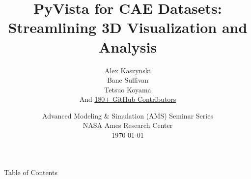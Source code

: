 \documentclass[t]{beamer}
\begin{document}
\title{
    PyVista for CAE Datasets: \\
    Streamlining 3D Visualization and Analysis
}

\author{
{\large Alex Kaszynski} \\[4pt]
{\large Bane Sullivan} \\[4pt]
{\large Tetsuo Koyama} \\[4pt]
{\large And \href{https://github.com/pyvista/pyvista/graphs/contributors}{180+ GitHub Contributors}}
}

\date{
\vspace{20pt}
{\large Advanced Modeling \& Simulation (AMS) Seminar Series} \\[6pt]
{\large NASA Ames Research Center} \\[12pt]
{\large \today}
}

\maketitle

\begin{frame}{Table of Contents}
    \tableofcontents
\end{frame}
\end{document}
